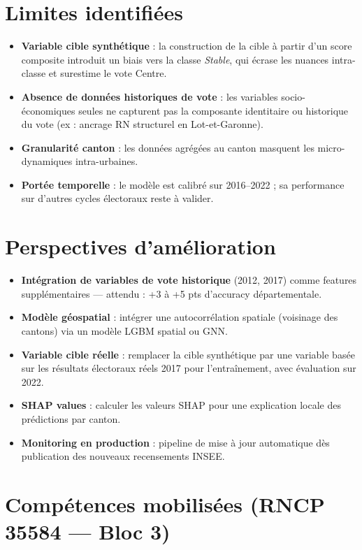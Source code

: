 \section*{Limites identifiées}

\begin{itemize}
  \item \textbf{Variable cible synthétique} : la construction de la cible à partir
    d'un score composite introduit un biais vers la classe \textit{Stable}, qui
    écrase les nuances intra-classe et surestime le vote Centre.
  \item \textbf{Absence de données historiques de vote} : les variables socio-économiques
    seules ne capturent pas la composante identitaire ou historique du vote (ex : ancrage
    RN structurel en Lot-et-Garonne).
  \item \textbf{Granularité canton} : les données agrégées au canton masquent les
    micro-dynamiques intra-urbaines.
  \item \textbf{Portée temporelle} : le modèle est calibré sur 2016--2022 ; sa
    performance sur d'autres cycles électoraux reste à valider.
\end{itemize}

\section*{Perspectives d'amélioration}

\begin{itemize}
  \item \textbf{Intégration de variables de vote historique} (2012, 2017) comme
    features supplémentaires — attendu : +3 à +5 pts d'accuracy départementale.
  \item \textbf{Modèle géospatial} : intégrer une autocorrélation spatiale (voisinage
    des cantons) via un modèle LGBM spatial ou GNN.
  \item \textbf{Variable cible réelle} : remplacer la cible synthétique par une
    variable basée sur les résultats électoraux réels 2017 pour l'entraînement,
    avec évaluation sur 2022.
  \item \textbf{SHAP values} : calculer les valeurs SHAP pour une explication
    locale des prédictions par canton.
  \item \textbf{Monitoring en production} : pipeline de mise à jour automatique
    dès publication des nouveaux recensements INSEE.
\end{itemize}

\section*{Compétences mobilisées (RNCP 35584 — Bloc 3)}

